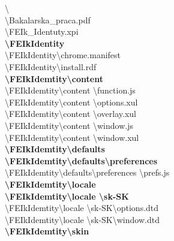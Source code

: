 \textbackslash \\
\textbackslash Bakalarska\_praca.pdf \\
\textbackslash FEIk\_Identuty.xpi \\
\textbf{\textbackslash FEIkIdentity} \\
\textbackslash FEIkIdentity\textbackslash chrome.manifest \\
\textbackslash FEIkIdentity\textbackslash install.rdf \\
\textbf{\textbackslash FEIkIdemtity\textbackslash content} \\
\textbackslash FEIkIdemtity\textbackslash content \textbackslash function.js \\
\textbackslash FEIkIdemtity\textbackslash content \textbackslash options.xul \\
\textbackslash FEIkIdemtity\textbackslash content \textbackslash overlay.xul \\
\textbackslash FEIkIdemtity\textbackslash content \textbackslash window.js \\
\textbackslash FEIkIdemtity\textbackslash content \textbackslash window.xul \\
\textbf{\textbackslash FEIkIdemtity\textbackslash defaults} \\
\textbf{\textbackslash FEIkIdemtity\textbackslash defaults\textbackslash preferences} \\
\textbackslash FEIkIdemtity\textbackslash defaults\textbackslash preferences \textbackslash prefs.js \\
\textbf{\textbackslash FEIkIdemtity\textbackslash locale} \\
\textbf{\textbackslash FEIkIdemtity\textbackslash locale \textbackslash sk-SK} \\
\textbackslash FEIkIdemtity\textbackslash locale \textbackslash sk-SK\textbackslash  options.dtd \\
\textbackslash FEIkIdemtity\textbackslash locale \textbackslash sk-SK\textbackslash  window.dtd \\
\textbf{\textbackslash FEIkIdemtity\textbackslash skin}